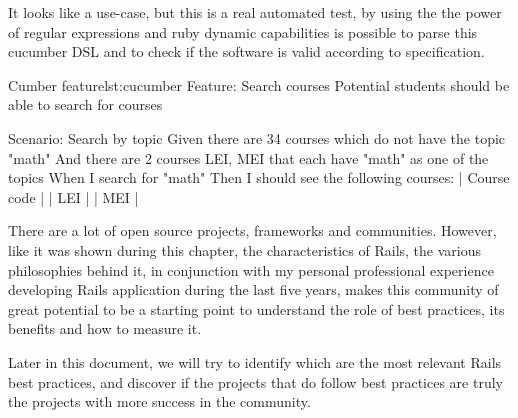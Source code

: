It looks like a use-case, but this is a real automated test, 
by using the the power of regular expressions and ruby dynamic capabilities
is possible to parse this cucumber DSL and to check if the software is valid according to specification. 

\begin{rubycode}{Cumber feature}{lst:cucumber}
Feature: Search courses
  Potential students should be able to search for courses

  Scenario: Search by topic
    Given there are 34 courses which do not have the topic "math"
    And there are 2 courses LEI, MEI that each have "math" as one of the topics
    When I search for "math"
    Then I should see the following courses:
      | Course code |
      | LEI         |
      | MEI         |
\end{rubycode}

There are a lot of open source projects, frameworks and communities. 
However, like it was shown during this chapter, the characteristics of Rails, the various philosophies behind it,
in conjunction with my personal professional experience developing Rails application during the last five years,
makes this community of great potential to be a starting point to understand the role of best practices, 
its benefits and how to measure it. 

Later in this document, we will try to identify which are the most relevant Rails best practices,
and discover if the projects that do follow best practices are truly the projects with more success in the community.

